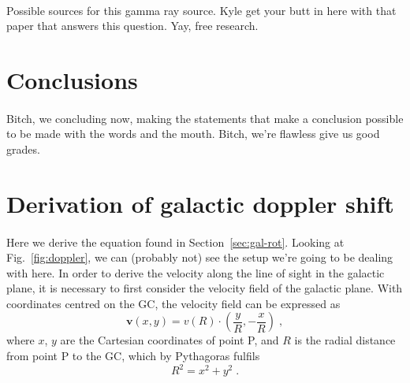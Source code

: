 \documentclass[a4paper, titlepage, oneside]{article}
\begin{document}
\begin{multicols}{2}
\paragraph{}
Possible sources for this gamma ray source. Kyle get your butt in here with that paper that answers this question. Yay, free research.

\section{Conclusions}
\paragraph{}
Bitch, we concluding now, making the statements that make a conclusion possible to be made with the words and the mouth. Bitch, we're flawless give us good grades.
\end{multicols}

\printbibliography[heading = bibintoc] %

\newpage

\appendix

\section{Derivation of galactic doppler shift}
\label{app:doppler}
\paragraph{}
Here we derive the equation found in Section~\ref{sec:gal-rot}. Looking at Fig.~\ref{fig:doppler}, we can (probably not) see the setup we're going to be dealing with here. In order to derive the velocity along the line of sight in the galactic plane, it is necessary to first consider the velocity field of the galactic plane. With coordinates centred on the GC, the velocity field can be expressed as
\begin{equation}
  \label{eq:vel-field}
  \mathbf{v}(x,y)=v(R)\cdot\!\left(\frac{y}{R},-\frac{x}{R}\right)\;,
\end{equation}
where \(x\), \(y\) are the Cartesian coordinates of point P, and \(R\) is the radial distance from point P to the GC, which by Pythagoras fulfils
\begin{equation}
  R^2=x^2+y^2\;.
\end{equation}
\end{document}
